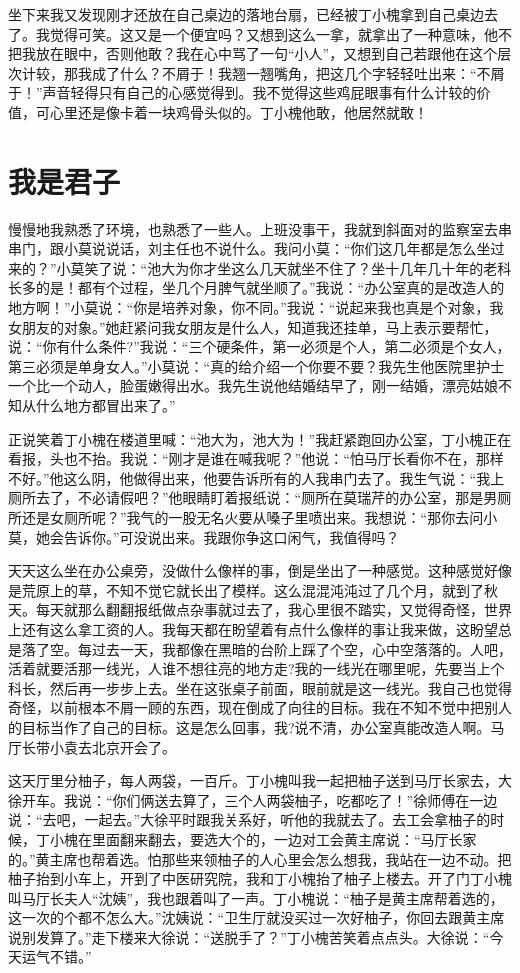 \documentclass[12pt,oneside]{book}
\begin{document}
坐下来我又发现刚才还放在自己桌边的落地台扇，已经被丁小槐拿到自己桌边去了。我觉得可笑。这又是一个便宜吗？又想到这么一拿，就拿出了一种意味，他不把我放在眼中，否则他敢？我在心中骂了一句``小人''，又想到自己若跟他在这个层次计较，那我成了什么？不屑于！我翘一翘嘴角，把这几个字轻轻吐出来：``不屑于！''声音轻得只有自己的心感觉得到。我不觉得这些鸡屁眼事有什么计较的价值，可心里还是像卡着一块鸡骨头似的。丁小槐他敢，他居然就敢！


\chapter{我是君子}
慢慢地我熟悉了环境，也熟悉了一些人。上班没事干，我就到斜面对的监察室去串串门，跟小莫说说话，刘主任也不说什么。我问小莫：``你们这几年都是怎么坐过来的？''小莫笑了说：``池大为你才坐这么几天就坐不住了？坐十几年几十年的老科长多的是！都有个过程，坐几个月脾气就坐顺了。''我说：``办公室真的是改造人的地方啊！''小莫说：``你是培养对象，你不同。''我说：``说起来我也真是个对象，我女朋友的对象。''她赶紧问我女朋友是什么人，知道我还挂单，马上表示要帮忙，说：``你有什么条件?''我说：``三个硬条件，第一必须是个人，第二必须是个女人，第三必须是单身女人。''小莫说：``真的给介绍一个你要不要？我先生他医院里护士一个比一个动人，脸蛋嫩得出水。我先生说他结婚结早了，刚一结婚，漂亮姑娘不知从什么地方都冒出来了。''

正说笑着丁小槐在楼道里喊：``池大为，池大为！''我赶紧跑回办公室，丁小槐正在看报，头也不抬。我说：``刚才是谁在喊我呢？''他说：``怕马厅长看你不在，那样不好。''他这么阴，他做得出来，他要告诉所有的人我串门去了。我生气说：``我上厕所去了，不必请假吧？''他眼睛盯着报纸说：``厕所在莫瑞芹的办公室，那是男厕所还是女厕所呢？''我气的一股无名火要从嗓子里喷出来。我想说：``那你去问小莫，她会告诉你。''可没说出来。我跟你争这口闲气，我值得吗？

天天这么坐在办公桌旁，没做什么像样的事，倒是坐出了一种感觉。这种感觉好像是荒原上的草，不知不觉它就长出了模样。这么混混沌沌过了几个月，就到了秋天。每天就那么翻翻报纸做点杂事就过去了，我心里很不踏实，又觉得奇怪，世界上还有这么拿工资的人。我每天都在盼望着有点什么像样的事让我来做，这盼望总是落了空。每过去一天，我都像在黑暗的台阶上踩了个空，心中空落落的。人吧，活着就要活那一线光，人谁不想往亮的地方走?我的一线光在哪里呢，先要当上个科长，然后再一步步上去。坐在这张桌子前面，眼前就是这一线光。我自己也觉得奇怪，以前根本不屑一顾的东西，现在倒成了向往的目标。我在不知不觉中把别人的目标当作了自己的目标。这是怎么回事，我?说不清，办公室真能改造人啊。马厅长带小袁去北京开会了。

这天厅里分柚子，每人两袋，一百斤。丁小槐叫我一起把柚子送到马厅长家去，大徐开车。我说：``你们俩送去算了，三个人两袋柚子，吃都吃了！''徐师傅在一边说：``去吧，一起去。''大徐平时跟我关系好，听他的我就去了。去工会拿柚子的时候，丁小槐在里面翻来翻去，要选大个的，一边对工会黄主席说：``马厅长家的。''黄主席也帮着选。怕那些来领柚子的人心里会怎么想我，我站在一边不动。把柚子抬到小车上，开到了中医研究院，我和丁小槐抬了柚子上楼去。开了门丁小槐叫马厅长夫人``沈姨''，我也跟着叫了一声。丁小槐说：``柚子是黄主席帮着选的，这一次的个都不怎么大。''沈姨说：``卫生厅就没买过一次好柚子，你回去跟黄主席说别发算了。''走下楼来大徐说：``送脱手了？''丁小槐苦笑着点点头。大徐说：``今天运气不错。''
\end{document}
